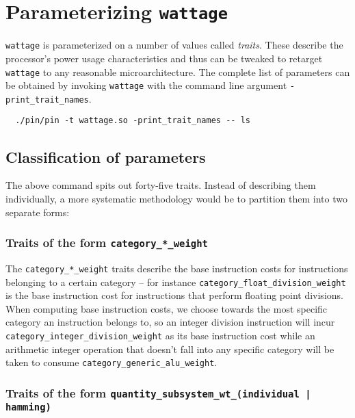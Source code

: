
\chapter{Parameterizing \texttt{wattage}} %

\label{AppendixA}


\texttt{wattage} is parameterized on a number of values called
\textit{traits}.  These describe the processor's power usage
characteristics and thus can be tweaked to retarget \texttt{wattage}
to any reasonable microarchitecture.  The complete list of parameters
can be obtained by invoking \texttt{wattage} with the command line
argument \texttt{-print\_trait\_names}.

\begin{verbatim}
  ./pin/pin -t wattage.so -print_trait_names -- ls
\end{verbatim}

\section{Classification of parameters}
\label{sec:parameters-desc}

The above command spits out forty-five traits.  Instead of describing
them individually, a more systematic methodology would be to partition
them into two separate forms:

\subsection{Traits of the form \texttt{category\_*\_weight}}

The \texttt{category\_*\_weight} traits describe the base instruction
costs for instructions belonging to a certain category -- for instance
\texttt{category\_float\_division\_weight} is the base instruction
cost for instructions that perform floating point divisions.  When
computing base instruction costs, we choose towards the most specific
category an instruction belongs to, so an integer division instruction
will incur \texttt{category\_integer\_division\_weight} as its base
instruction cost while an arithmetic integer operation that doesn't
fall into any specific category will be taken to consume
\texttt{category\_generic\_alu\_weight}.

\subsection{Traits of the form \texttt{quantity\_subsystem\_wt\_(individual | hamming) }}

